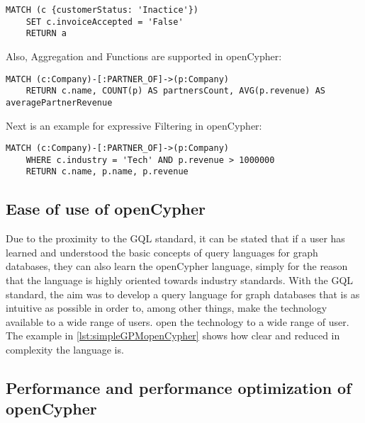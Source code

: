 \begin{lstlisting}[caption={Graph Pattern Matching in openCypher}, label={lst:simpleGPMOC}] 
	MATCH (c {customerStatus: 'Inactice'})
	SET c.invoiceAccepted = 'False'
	RETURN a
\end{lstlisting}


Also, Aggregation and Functions are supported in openCypher:
\begin{lstlisting}[caption={Aggregation and Functions in openCypher}, label={lst:aggregationFunctionsOC}]
	MATCH (c:Company)-[:PARTNER_OF]->(p:Company)
	RETURN c.name, COUNT(p) AS partnersCount, AVG(p.revenue) AS averagePartnerRevenue
\end{lstlisting}
Next is an example for expressive Filtering in openCypher:
\begin{lstlisting}[caption={Expressive Filtering in openCypher with Company Nodes}, label={lst:companyExpressiveFilteringOC}]
	MATCH (c:Company)-[:PARTNER_OF]->(p:Company)
	WHERE c.industry = 'Tech' AND p.revenue > 1000000
	RETURN c.name, p.name, p.revenue
\end{lstlisting}

\subsection{Ease of use of openCypher}
Due to the proximity to the GQL standard, it can be stated that if a user has learned 
and understood the basic concepts of query languages for graph databases, 
they can also learn the openCypher language, 
simply for the reason that the language is highly oriented towards industry standards.
With the GQL standard, the aim was to develop a query language for graph databases that is as intuitive as possible in order to, among other things, make the technology available to a wide range of users. 
open the technology to a wide range of user.
The example in \cref{lst:simpleGPMopenCypher} shows how clear and reduced in complexity the language is.


\subsection{Performance and performance optimization of openCypher}

